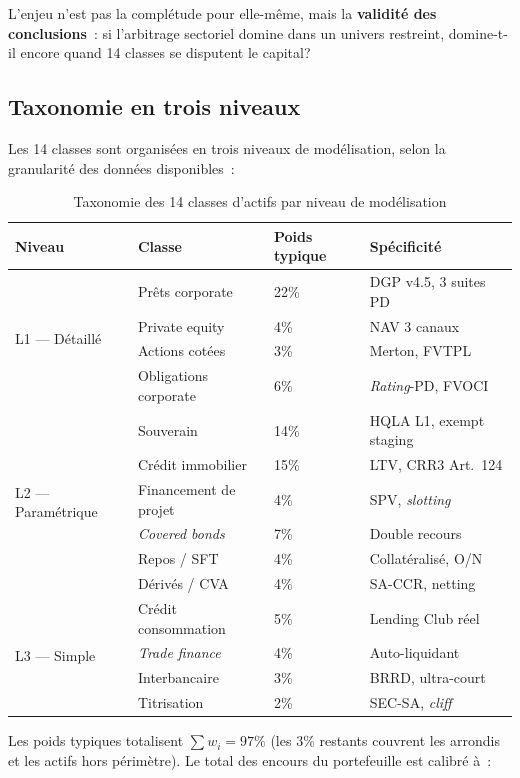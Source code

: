 \documentclass[12pt, a4paper, twoside, openright]{report}
\theoremstyle{definition}
\begin{document}
L'enjeu n'est pas la complétude pour elle-même, mais la \textbf{validité des conclusions}~: si l'arbitrage sectoriel domine dans un univers restreint, domine-t-il encore quand 14 classes se disputent le capital?

\subsection{Taxonomie en trois niveaux}

Les 14 classes sont organisées en trois niveaux de modélisation, selon la granularité des données disponibles~:

\begin{table}[htbp]
\centering
\caption{Taxonomie des 14 classes d'actifs par niveau de modélisation}
\label{tab:taxonomie-14}
\begin{tabular}{llll}
\toprule
\textbf{Niveau} & \textbf{Classe} & \textbf{Poids typique} & \textbf{Spécificité} \\
\midrule
\multirow{4}{*}{L1 — Détaillé} & Prêts corporate & 22\% & DGP v4.5, 3 suites PD \\
 & Private equity & 4\% & NAV 3 canaux \\
 & Actions cotées & 3\% & Merton, FVTPL \\
 & Obligations corporate & 6\% & \textit{Rating}-PD, FVOCI \\
\midrule
\multirow{6}{*}{L2 — Paramétrique} & Souverain & 14\% & HQLA L1, exempt staging \\
 & Crédit immobilier & 15\% & LTV, CRR3 Art.~124 \\
 & Financement de projet & 4\% & SPV, \textit{slotting} \\
 & \textit{Covered bonds} & 7\% & Double recours \\
 & Repos / SFT & 4\% & Collatéralisé, O/N \\
 & Dérivés / CVA & 4\% & SA-CCR, netting \\
\midrule
\multirow{4}{*}{L3 — Simple} & Crédit consommation & 5\% & Lending Club réel \\
 & \textit{Trade finance} & 4\% & Auto-liquidant \\
 & Interbancaire & 3\% & BRRD, ultra-court \\
 & Titrisation & 2\% & SEC-SA, \textit{cliff} \\
\bottomrule
\end{tabular}
\end{table}

Les poids typiques totalisent $\sum w_i = 97\%$ (les 3\% restants couvrent les arrondis et les actifs hors périmètre). Le total des encours du portefeuille est calibré à~:
\end{document}
